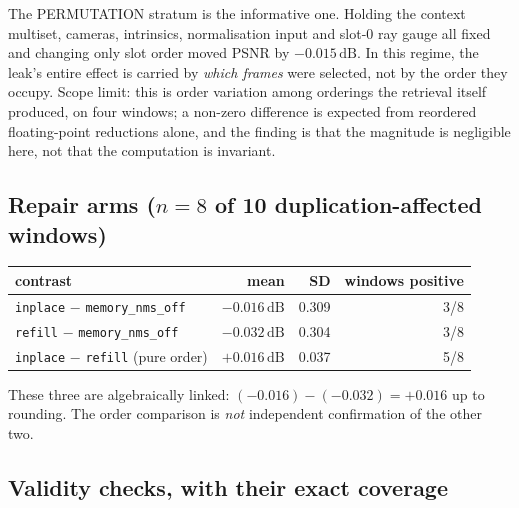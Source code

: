 \documentclass[11pt,a4paper]{article}
\newcommand{\code}[1]{\texttt{\small #1}}
\newcommand{\dB}{\,\mathrm{dB}}
\begin{document}
The PERMUTATION stratum is the informative one. Holding the context multiset, cameras, intrinsics,
normalisation input and slot-0 ray gauge all fixed and changing only slot order moved PSNR by
$-0.015\dB$. In this regime, the leak's entire effect is carried by \emph{which frames} were
selected, not by the order they occupy. Scope limit: this is order variation among orderings the
retrieval itself produced, on four windows; a non-zero difference is expected from reordered
floating-point reductions alone, and the finding is that the magnitude is negligible here, not that
the computation is invariant.

\subsection{Repair arms ($n=8$ of 10 duplication-affected windows)}

\begin{center}\small
\begin{tabular}{@{}lrrr@{}}
\toprule
contrast & mean & SD & windows positive \\
\midrule
\code{inplace} $-$ \code{memory\_nms\_off} & $\mathbf{-0.016\dB}$ & 0.309 & 3/8 \\
\code{refill}  $-$ \code{memory\_nms\_off} & $-0.032\dB$ & 0.304 & 3/8 \\
\code{inplace} $-$ \code{refill} (pure order) & $+0.016\dB$ & 0.037 & 5/8 \\
\bottomrule
\end{tabular}
\end{center}

These three are algebraically linked: $(-0.016)-(-0.032)=+0.016$ up to rounding. The order comparison
is \emph{not} independent confirmation of the other two.

\subsection{Validity checks, with their exact coverage}
\end{document}
